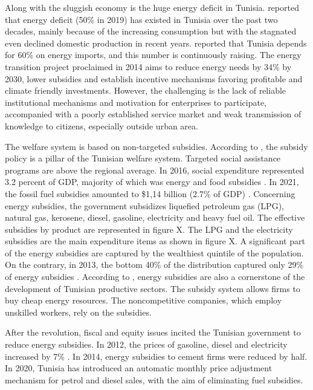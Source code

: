 \documentclass[
]{article}
\begin{document}
Along with the sluggish economy is the huge energy deficit in Tunisia.
\textcite{irena2021} reported that energy deficit (50\% in 2019) has
existed in Tunisia over the past two decades, mainly because of the
increasing consumption but with the stagnated even declined domestic
production in recent years. \textcite{giz} reported that Tunisia depends
for 60\% on energy imports, and this number is continuously raising. The
energy transition project proclaimed in 2014 aims to reduce energy needs
by 34\% by 2030, lower subsidies and establish incentive mechanisms
favoring profitable and climate friendly investments. However, the
challenging is the lack of reliable institutional mechanisms and
motivation for enterprises to participate, accompanied with a poorly
established service market and weak transmission of knowledge to
citizens, especially outside urban area.

The welfare system is based on non-targeted subsidies. According to
\textcite{albertin2014}, the subsidy policy is a pillar of the Tunisian
welfare system. Targeted social assistance programs are above the
regional average. In 2016, social expenditure represented 3.2 percent of
GDP, majority of which was energy and food subsidies
\autocite{tunisia2020}. In 2021, the fossil fuel subsidies amounted to
\$1,14 billion (2.7\% of GDP) \autocite{trésor2021}. Concerning energy
subsidies, the government subsidizes liquefied petroleum gas (LPG),
natural gas, kerosene, diesel, gasoline, electricity and heavy fuel oil.
The effective subsidies by product are represented in figure X. The LPG
and the electricity subsidies are the main expenditure items as shown in
figure X. A significant part of the energy subsidies are captured by the
wealthiest quintile of the population. On the contrary, in 2013, the
bottom 40\% of the distribution captured only 29\% of energy subsidies
\autocite{worldbank2014}. According to \textcite{cuesta2017} , energy
subsidies are also a cornerstone of the development of Tunisian
productive sectors. The subsidy system allows firms to buy cheap energy
resources. The noncompetitive companies, which employ unskilled workers,
rely on the subsidies.

After the revolution, fiscal and equity issues incited the Tunisian
government to reduce energy subsidies. In 2012, the prices of gasoline,
diesel and electricity increased by 7\% \autocite{albertin2014}. In
2014, energy subsidies to cement firms were reduced by half. In 2020,
Tunisia has introduced an automatic monthly price adjustment mechanism
for petrol and diesel sales, with the aim of eliminating fuel subsidies.
\end{document}
